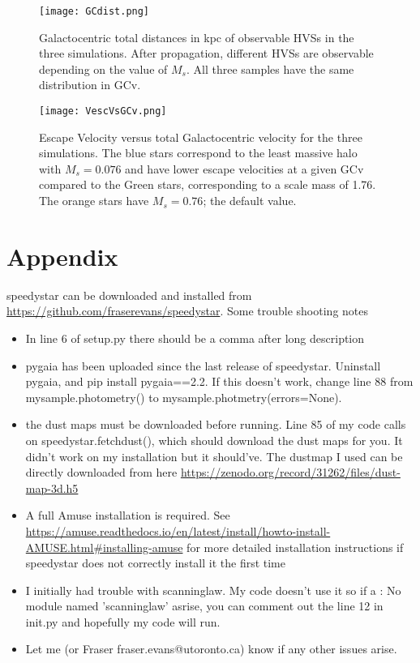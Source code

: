 \documentclass[12pt]{article}
\begin{document}
\begin{figure}[H]
    \centering
    \texttt{[image: GCdist.png]}
    \caption{Galactocentric total distances in kpc of observable HVSs in the three simulations. After propagation, different HVSs are observable depending on the value of $M_s$.  
    All three samples have the same distribution in GCv.}
    \label{fig:GCdist}
\end{figure}

\begin{figure}[htb]
    \centering
    \texttt{[image: VescVsGCv.png]}
    \caption{Escape Velocity versus total Galactocentric velocity for the three simulations. The blue stars correspond to the least massive halo with $M_s = 0.076$ and have lower escape velocities at a given GCv compared to the Green stars, corresponding to a scale mass of 1.76. The orange stars have $M_s = 0.76$; the default value.}
    \label{fig:VescVsGCv}
\end{figure}




\pagebreak 
%
\section{Appendix}\label{appendix}

{\selectfont speedystar} can be downloaded and installed from \url{https://github.com/fraserevans/speedystar}. Some trouble shooting notes 
\begin{itemize}
    \item In line 6 of setup.py there should be a comma after long\textunderscore 
    description 
    \item pygaia has been uploaded since the last release of speedystar. Uninstall pygaia, and pip install pygaia==2.2. If this doesn't work, change line 88 from mysample.photometry() to mysample.photmetry(errors=None). 
    
    \item the dust maps must be downloaded before running. Line 85 of my code calls on speedystar.fetch\textunderscore dust(), which should download the dust maps for you. It didn't work on my installation but it should've. The dustmap I used can be directly downloaded from here \url{https://zenodo.org/record/31262/files/dust-map-3d.h5}
    
    \item A full Amuse installation is required. See \url{https://amuse.readthedocs.io/en/latest/install/howto-install-AMUSE.html#installing-amuse} for more detailed installation instructions if speedystar does not correctly install it the first time 
    \item I initially had trouble with scanninglaw. My code doesn't use it so if a : No module named 'scanninglaw' asrise, you can comment out the line 12 in \textunderscore\textunderscore init\textunderscore\textunderscore .py and hopefully my code will run.
    \item Let me (or Fraser fraser.evans@utoronto.ca) know if any other issues arise.
\end{itemize}

\section*{}\label{refrences}



\end{document}
